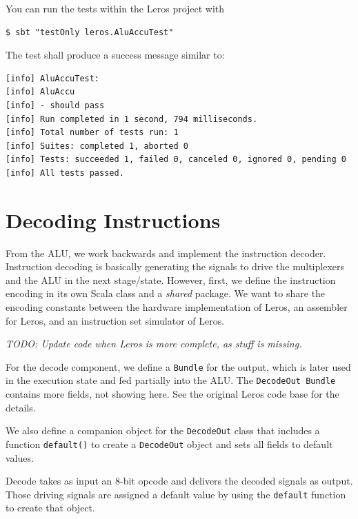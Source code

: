 \documentclass[%
    10pt,
    headinclude, footexclude,
    openright, %
    notitlepage,
    cleardoubleempty,
    headsepline,
    pointlessnumbers,
    bibtotoc, idxtotoc,
    ]{scrbook}
\newcommand{\code}[1]{{\small{\texttt{#1}}}}
\newcommand{\todo}[1]{{\emph{TODO: #1}}}
\begin{document}

\noindent You can run the tests within the Leros project with

\begin{verbatim}
$ sbt "testOnly leros.AluAccuTest"
\end{verbatim}

The test shall produce a success message similar to:

\begin{verbatim}
[info] AluAccuTest:
[info] AluAccu
[info] - should pass
[info] Run completed in 1 second, 794 milliseconds.
[info] Total number of tests run: 1
[info] Suites: completed 1, aborted 0
[info] Tests: succeeded 1, failed 0, canceled 0, ignored 0, pending 0
[info] All tests passed.
\end{verbatim}

\section{Decoding Instructions}


From the ALU, we work backwards and implement the instruction decoder.
Instruction decoding is basically generating the signals to drive the multiplexers
and the ALU in the next stage/state.
However, first, we define the instruction encoding in its own Scala class and
a \emph{shared} package. We want to share the encoding constants between
the hardware implementation of Leros, an assembler for Leros, and an instruction
set simulator of Leros.


\todo{Update code when Leros is more complete, as stuff is missing.}

\noindent For the decode component, we define a \code{Bundle} for the output,
which is later used in the execution state and fed partially into the ALU.
The \code{DecodeOut Bundle} contains more fields,
not showing here. See the original Leros code base for the details.


\noindent We also define a companion object for the \code{DecodeOut} class that includes a
function \code{default()} to create a \code{DecodeOut} object and sets all fields to
default values.
 

\noindent Decode takes as input an 8-bit opcode and delivers the decoded signals
as output. Those driving signals are assigned a default value by using the \code{default}
function to create that object.
\end{document}
